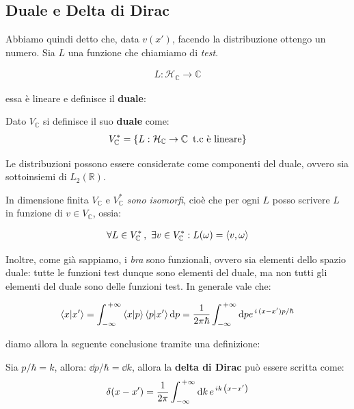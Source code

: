 \subsection{Duale e Delta di Dirac}

	Abbiamo quindi detto che, data $v(x')$, facendo la distribuzione ottengo un numero. Sia $L$ una funzione che chiamiamo di \textit{test}.
	
\begin{align*}
	L : \mathcal{H}_{\mathbb{C}} \to \mathbb{C}
\end{align*}

	essa è lineare e definisce il \textbf{duale}:
	
\begin{mydef}
	Dato $V_{\mathbb{C}}$ si definisce il suo \textbf{duale} come:
\begin{align*}
	V_{\mathbb{C}}^* = \qty{L : \mathcal{H}_{\mathbb{C}} \to \mathbb{C} \,\,\, \text{t.c è lineare}}
\end{align*}
\end{mydef}
	
	Le distribuzioni possono essere considerate come componenti del duale, ovvero sia sottoinsiemi di $L_2(\mathbb{R})$. 

\begin{nb}
	In dimensione finita $V_{\mathbb{C}}$ e $V^*_{\mathbb{C}}$ \textit{sono isomorfi}, cioè che per ogni $L$ posso scrivere $L$ in funzione di $v \in V_{\mathbb{C}}$, ossia:

\begin{align*}
	\forall L \in V^*_{\mathbb{C}}\,,\,\, \exists v \in V^*_{\mathbb{C}} : L(\omega) = \langle v, \omega \rangle
\end{align*}
\end{nb}
	
	Inoltre, come già sappiamo, i \textit{bra} sono funzionali, ovvero sia elementi dello spazio duale: tutte le funzioni test dunque sono elementi del duale, ma non tutti gli elementi del duale sono delle funzioni test. In generale vale che:
	
\begin{align*}
	\braket{x}{x'} = \int_{-\infty}^{\, +\infty} \braket{x}{p} \braket{p}{x'} \dd p = \frac{1}{2\pi\hbar} \int_{-\infty}^{\, +\infty} \dd p e^{\, i\, (x-x') p/\hbar}
\end{align*}

	diamo allora la seguente conclusione tramite una definizione:
	
\begin{mydef}
	Sia $p/\hbar = k$, allora: $\dd p /\hbar = \dd k$, allora la \textbf{delta di Dirac} può essere scritta come:
\begin{align*}
	\delta(x-x') = \frac{1}{2\pi} \int_{-\infty}^{\, +\infty} \dd k \, e^{\, ik \, \qty(x-x')} 
\end{align*}
\end{mydef}

